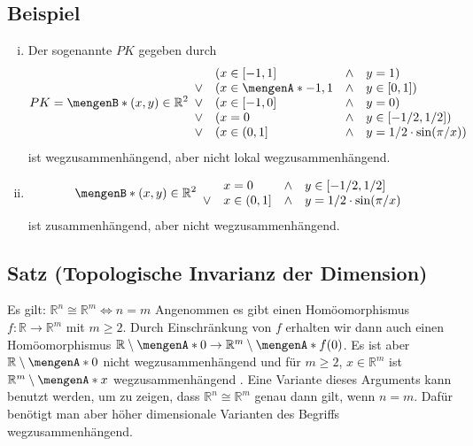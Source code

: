 \subsection[Beispiele zu (weg-)zusammenhängenden Räumen]{Beispiel} %
\label{sub:83}
\begin{enumerate}[(i)]
	\item Der sogenannte  $PK$ gegeben durch
	\[
		PK = \set[(x,y) \in \mathds{R}^2]{ \begin{array}{rlcl}
			 & (x \in [{-1,1}] &\wedge& y=1) \\
			\vee & (x \in \set{-1,1} &\wedge& y \in [0,1])  \\
			\vee & (x \in [-1,0] & \wedge& y = 0) \\
			\vee & (x=0 & \wedge & y \in [-1/2, 1/2]) \\
			\vee & (x \in (0,1] & \wedge& y= 1/2 \cdot \sin (\pi/x))
		\end{array}} 
	\]
	ist wegzusammenhängend, aber nicht lokal wegzusammenhängend.
	\item 
	\[
		\set[(x,y) \in \mathds{R}^2]{ \begin{array}{rlcl}
					 & x=0 & \wedge & y \in [-1/2, 1/2] \\
					\vee & x \in (0,1] & \wedge& y= 1/2 \cdot \sin (\pi/x)
				\end{array}}
	\]
	ist zusammenhängend, aber nicht wegzusammenhängend.
\end{enumerate}

\subsection{Satz (Topologische Invarianz der Dimension)} %
\label{sub:84}
Es gilt: $\mathds{R}^n \cong \mathds{R}^m \iff n=m$
Angenommen es gibt einen Homöomorphismus $f : \mathds{R} \to \mathds{R}^m$ mit $m \ge 2$. Durch Einschränkung von $f$ erhalten wir dann auch einen Homöomorphismus 
$\mathds{R} \setminus\set{0} \to \mathds{R}^m \setminus \set{f(0)}$. Es ist aber $\mathds{R} \setminus \set{0}$ nicht wegzusammenhängend und für 
$m \ge 2$, $x \in \mathds{R}^m$ ist $\mathds{R}^m \setminus \set{x}$ wegzusammenhängend \light. \bewende
{}
Eine Variante dieses Arguments kann benutzt werden, um zu zeigen, dass $\mathds{R}^n \cong \mathds{R}^m$ genau dann gilt, wenn $n=m$. Dafür benötigt man aber höher dimensionale 
Varianten des Begriffs wegzusammenhängend.
\newpage

